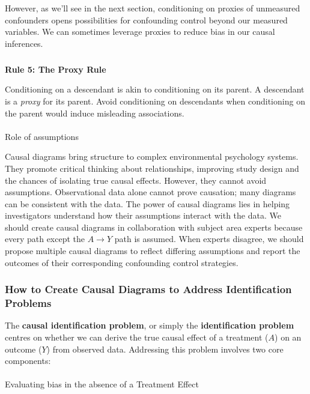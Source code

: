 \documentclass[
  singlecolumn]{article}
\makeatletter
\let\oldparagraph\paragraph
\renewcommand{\paragraph}{
    \@ifstar
      \xxxParagraphStar
      \xxxParagraphNoStar
  }
\newcommand{\xxxParagraphStar}[1]{\oldparagraph*{#1}\mbox{}}
\newcommand{\xxxParagraphNoStar}[1]{\oldparagraph{#1}\mbox{}}
\let\oldsubparagraph\subparagraph
\renewcommand{\subparagraph}{
    \@ifstar
      \xxxSubParagraphStar
      \xxxSubParagraphNoStar
  }
\newcommand{\xxxSubParagraphStar}[1]{\oldsubparagraph*{#1}\mbox{}}
\newcommand{\xxxSubParagraphNoStar}[1]{\oldsubparagraph{#1}\mbox{}}
\makeatother
\begin{document}
However, as we'll see in the next section, conditioning on proxies of
unmeasured confounders opens possibilities for confounding control
beyond our measured variables. We can sometimes leverage proxies to
reduce bias in our causal inferences.

\subparagraph{\texorpdfstring{\textbf{Rule 5: The Proxy
Rule}}{Rule 5: The Proxy Rule}}\label{rule-5-the-proxy-rule}

Conditioning on a descendant is akin to conditioning on its parent. A
descendant is a \emph{proxy} for its parent. Avoid conditioning on
descendants when conditioning on the parent would induce misleading
associations.

\paragraph{Role of assumptions}\label{role-of-assumptions}

Causal diagrams bring structure to complex environmental psychology
systems. They promote critical thinking about relationships, improving
study design and the chances of isolating true causal effects. However,
they cannot avoid assumptions. Observational data alone cannot prove
causation; many diagrams can be consistent with the data. The power of
causal diagrams lies in helping investigators understand how their
assumptions interact with the data. We should create causal diagrams in
collaboration with subject area experts because every path except the
\(A \to Y\) path is assumed. When experts disagree, we should propose
multiple causal diagrams to reflect differing assumptions and report the
outcomes of their corresponding confounding control strategies.

\subsubsection{How to Create Causal Diagrams to Address Identification
Problems}\label{how-to-create-causal-diagrams-to-address-identification-problems}

The \textbf{causal identification problem}, or simply the
\textbf{identification problem} centres on whether we can derive the
true causal effect of a treatment (\(A\)) on an outcome (\(Y\)) from
observed data. Addressing this problem involves two core components:

\paragraph{Evaluating bias in the absence of a Treatment
Effect}\label{evaluating-bias-in-the-absence-of-a-treatment-effect}
\end{document}
